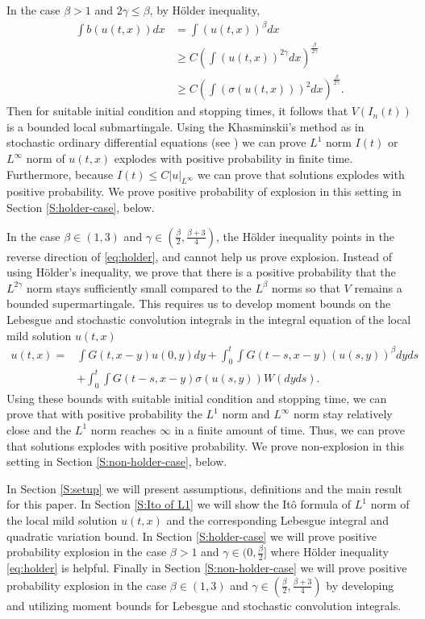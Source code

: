 \documentclass[12pt]{article}
\numberwithin{equation}{section}
\begin{document}
In the case $\beta>1$ and $2\gamma\leq \beta$, by H\"older inequality,
\begin{align} 
   \int b(u(t,x)) dx &=\int (u(t,x))^\beta dx \nonumber\\
   &\geq C \left(\int (u(t,x))^{2\gamma}dx\right)^{\frac{\beta}{2\gamma}}\nonumber\\
   &\geq C \left(\int (\sigma(u(t,x)))^2dx\right)^{\frac{\beta}{2\gamma}}.\label{eq:holder}
\end{align}
Then for suitable initial condition and stopping times, it follows that $V(I_n(t))$ is a bounded local submartingale. Using the Khasminskii's method as in stochastic ordinary differential equations (see \cite[Theorems 3.5 and 3.6]{Khasminskii}) we can prove $L^1$ norm $I(t)$ or $L^\infty$ norm of $u(t,x)$ explodes with positive probability in finite time. Furthermore, because $I(t)\leq C|u|_{L^\infty}$ we can prove that solutions explodes with positive probability. We prove positive probability of explosion in this setting in Section \ref{S:holder-case}, below.

In the case $\beta\in (1,3)$ and $\gamma\in(\frac{\beta}{2},\frac{\beta+3}{4})$, the H\"older inequality points in the reverse direction of \eqref{eq:holder}, and cannot help us prove explosion. Instead of using H\"older's inequality, we prove that there is a positive probability that the $L^{2\gamma}$ norm stays sufficiently small compared to the $L^\beta$ norms so that $V$ remains a bounded supermartingale. This requires us to develop moment bounds on the Lebesgue and stochastic convolution integrals in the integral equation of the local mild solution $u(t,x)$
\begin{align}
	u(t,x) = &\int G(t,x-y) u(0,y)dy + \int_0^t \int G(t-s,x-y)(u(s,y))^\beta dyds \nonumber\\
	&+ \int_0^t \int G(t-s,x-y)\sigma(u(s,y)) W(dyds). \label{eq:integral equation intro}
\end{align}
Using these bounds with suitable initial condition and stopping time, we can prove that with positive probability the $L^1$ norm and $L^\infty$ norm stay relatively close and the $L^1$ norm reaches $\infty$ in a finite amount of time. Thus, we can prove that solutions explodes with positive probability. We prove non-explosion in this setting in Section \ref{S:non-holder-case}, below.



In Section \ref{S:setup} we will present assumptions, definitions and the main result for this paper. In Section \ref{S:Ito of L1} we will show the It\^{o} formula of $L^1$ norm of the local mild solution $u(t,x)$ and the corresponding Lebesgue integral and quadratic variation bound. In Section \ref{S:holder-case} we will prove positive probability explosion in the case $\beta> 1$ and $\gamma\in(0,\frac{\beta}{2}]$ where H\"older inequality \eqref{eq:holder} is helpful. Finally in Section \ref{S:non-holder-case} we will prove positive probability explosion in the case $\beta\in (1,3)$ and $\gamma\in (\frac{\beta}{2},\frac{\beta+3}{4})$ by developing and utilizing moment bounds for Lebesgue and stochastic convolution integrals.
\end{document}
